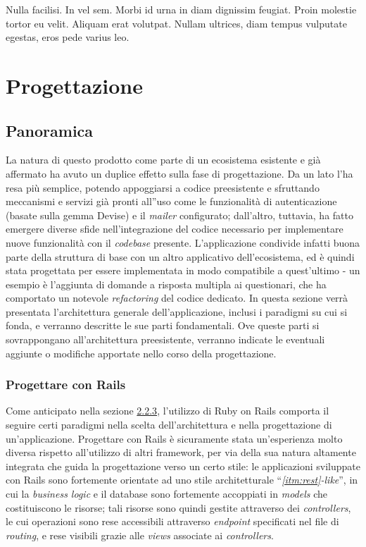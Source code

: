 

\begin{savequote}[75mm]
Nulla facilisi. In vel sem. Morbi id urna in diam dignissim feugiat. Proin molestie tortor eu velit. Aliquam erat volutpat. Nullam ultrices, diam tempus vulputate egestas, eros pede varius leo.
\end{savequote}

\chapter{Progettazione}
\section{Panoramica}
La natura di questo prodotto come parte di un ecosistema esistente e già affermato ha avuto un duplice effetto sulla fase di progettazione. Da un lato l'ha resa più semplice, potendo appoggiarsi a codice preesistente e sfruttando meccanismi e servizi già pronti all''uso come le funzionalità di autenticazione (basate sulla gemma Devise) e il \textit{mailer} configurato; dall'altro, tuttavia, ha fatto emergere diverse sfide nell'integrazione del codice necessario per implementare nuove funzionalità con il \textit{codebase} presente. L'applicazione condivide infatti buona parte della struttura di base con un altro applicativo dell'ecosistema, ed è quindi stata progettata per essere implementata in modo compatibile a quest'ultimo - un esempio è l'aggiunta di domande a risposta multipla ai questionari, che ha comportato un notevole \textit{refactoring} del codice dedicato.
In questa sezione verrà presentata l'architettura generale dell'applicazione, inclusi i paradigmi su cui si fonda, e verranno descritte le sue parti fondamentali. Ove queste parti si sovrappongano all'architettura preesistente, verranno indicate le eventuali aggiunte o modifiche apportate nello corso della progettazione.

\subsection{Progettare con Rails}
Come anticipato nella sezione \hyperref[sec:2.2.3]{2.2.3}, l'utilizzo di Ruby on Rails comporta il seguire certi paradigmi nella scelta dell'architettura e nella progettazione di un'applicazione. Progettare con Rails è sicuramente stata un'esperienza molto diversa rispetto all'utilizzo di altri framework, per via della sua natura altamente integrata che guida la progettazione verso un certo stile: le applicazioni sviluppate con Rails sono fortemente orientate ad uno stile architetturale ``\textit{\ref{itm:rest}-like}'', in cui la \textit{business logic} e il database sono fortemente accoppiati in \textit{models} che costituiscono le risorse; tali risorse sono quindi gestite attraverso dei \textit{controllers}, le cui operazioni sono rese accessibili attraverso \textit{endpoint} specificati nel file di \textit{routing}, e rese visibili grazie alle \textit{views} associate ai \textit{controllers}.

